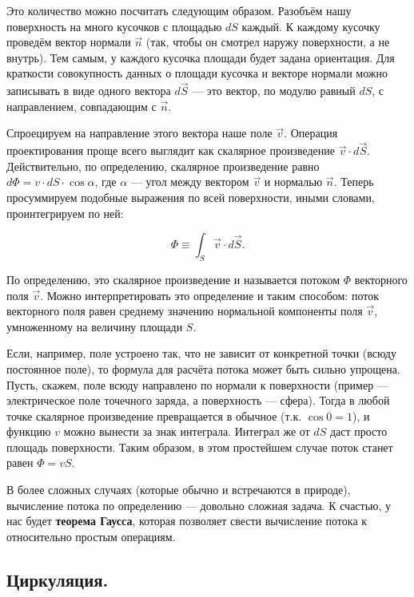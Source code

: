 \documentclass[a4paper,12pt]{article}
\numberwithin{equation}{section}
\begin{document}
Это количество можно посчитать следующим образом. Разобъём нашу
поверхность на много кусочков с площадью $dS$ каждый. К каждому
кусочку проведём вектор нормали $\vec{n}$ (так, чтобы он смотрел
наружу поверхности, а не внутрь). Тем самым, у каждого кусочка площади
будет задана ориентация. Для краткости совокупность данных о площади
кусочка и векторе нормали можно записывать в виде одного вектора
$d\vec{S}$ --- это вектор, по модулю равный $dS$, с направлением,
совпадающим с $\vec{n}$.

Спроецируем на направление этого вектора наше поле $\vec{v}$. Операция
проектирования проще всего выглядит как скалярное произведение
$\vec{v} \cdot d \vec{S}$. Действительно, по определению, скалярное
произведение равно $d\Phi = v \cdot dS \cdot \cos \alpha$, где $\alpha$ ---
угол между вектором $\vec{v}$ и нормалью $\vec{n}$. Теперь
просуммируем подобные выражения по всей поверхности, иными словами,
проинтегрируем по ней:

\begin{equation}
  \label{eq:def_flux}
  \Phi \equiv \int_S \vec{v} \cdot d \vec{S}.
\end{equation}

По определению, это скалярное произведение и называется потоком $\Phi$ 
векторного поля $\vec{v}$. Можно интерпретировать это определение и
таким способом: поток векторного поля равен среднему значению
нормальной компоненты поля $\vec{v}$, умноженному на величину площади
$S$. 

Если, например, поле устроено так, что не зависит от конкретной точки
(всюду постоянное поле), то формула для расчёта потока может быть
сильно упрощена. Пусть, скажем, поле всюду направлено по нормали к
поверхности (пример --- электрическое поле точечного заряда, а
поверхность --- сфера). Тогда в любой точке скалярное произведение
превращается в обычное (т.к. $\cos 0 = 1$), и функцию $v$ можно
вынести за знак интеграла. Интеграл же от $dS$ даст просто площадь
поверхности. Таким образом, в этом простейшем случае поток станет
равен $\Phi = vS$. 

В более сложных случаях (которые обычно и встречаются в природе),
вычисление потока по определению --- довольно сложная задача. К
счастью, у нас будет \textbf{теорема Гаусса}, которая позволяет свести
вычисление потока к относительно простым операциям. 

\subsection{Циркуляция.}
\label{sec:curl}
\end{document}
